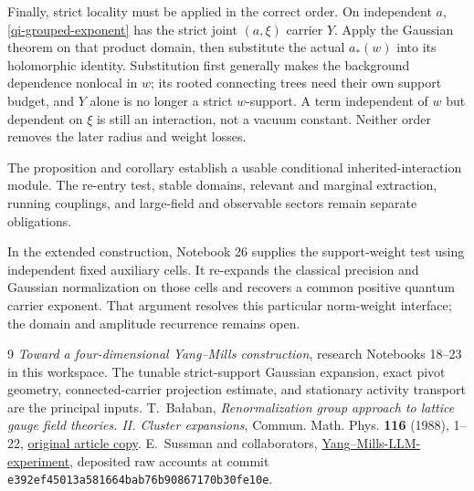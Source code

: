 \documentclass[11pt]{article}
\theoremstyle{remark}
\begin{document}
Finally, strict locality must be applied in the correct order.
On independent $a$, \eqref{qi-grouped-exponent} has the strict
joint $(a,\xi)$ carrier $Y$. Apply the Gaussian theorem on that
product domain, then substitute the actual $a_*(w)$ into its
holomorphic identity. Substitution first generally makes the
background dependence nonlocal in $w$; its rooted connecting
trees need their own support budget, and $Y$ alone is no
longer a strict $w$-support. A term independent of $w$ but
dependent on $\xi$ is still an interaction, not a vacuum
constant. Neither order removes the later radius and weight
losses.

The proposition and corollary establish a usable conditional
inherited-interaction module. The re-entry test, stable domains,
relevant and marginal extraction, running couplings, and
large-field and observable sectors remain separate obligations.

In the extended construction, Notebook 26 supplies the support-weight
test using independent fixed auxiliary cells. It re-expands the
classical precision and Gaussian normalization on those cells
and recovers a common positive quantum carrier exponent.
That argument resolves this particular norm-weight interface;
the domain and amplitude recurrence remains open.


\begin{thebibliography}{9}
\emph{Toward a four-dimensional Yang--Mills construction},
research Notebooks 18--23 in this workspace.
The tunable strict-support Gaussian expansion, exact pivot
geometry, connected-carrier projection estimate, and
stationary activity transport are the principal inputs.
T.~Ba\l aban,
\emph{Renormalization group approach to lattice gauge field
theories. II. Cluster expansions},
Commun. Math. Phys. \textbf{116} (1988), 1--22,
\href{https://scispace.com/pdf/renormalization-group-approach-to-lattice-gauge-field-4penm4k7hc.pdf}{original article copy}.
E.~Sussman and collaborators,
\href{https://github.com/ethanwsussman/Yang--Mills-LLM-experiment}{Yang--Mills-LLM-experiment},
deposited raw accounts at commit
\texttt{e392ef45013a581664bab76b90867170b30fe10e}.
\end{thebibliography}
\end{document}
